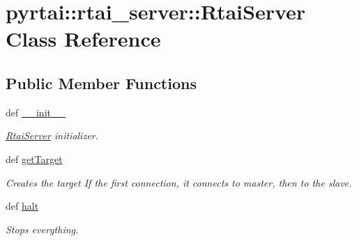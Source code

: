 \hypertarget{classpyrtai_1_1rtai__server_1_1_rtai_server}{
\section{pyrtai\-:\-:rtai\-\_\-server\-:\-:\-Rtai\-Server \-Class \-Reference}
\label{classpyrtai_1_1rtai__server_1_1_rtai_server}
}
\subsection*{\-Public \-Member \-Functions}
\begin{DoxyCompactItemize}
\item 
def \hyperlink{classpyrtai_1_1rtai__server_1_1_rtai_server_a007e1e53170de1e75e6d0561fdbeec70}{\-\_\-\-\_\-init\-\_\-\-\_\-}
\begin{DoxyCompactList}\small\item\em \hyperlink{classpyrtai_1_1rtai__server_1_1_rtai_server}{\-Rtai\-Server} initializer. \end{DoxyCompactList}\item 
def \hyperlink{classpyrtai_1_1rtai__server_1_1_rtai_server_a09adc29cacb9005385e0408ef44aa698}{get\-Target}
\begin{DoxyCompactList}\small\item\em \-Creates the target \-If the first connection, it connects to master, then to the slave. \end{DoxyCompactList}\item 
def \hyperlink{classpyrtai_1_1rtai__server_1_1_rtai_server_a55d330bcb7d996b6417018c7462d9e11}{halt}
\begin{DoxyCompactList}\small\item\em \-Stops everything. \end{DoxyCompactList}\end{DoxyCompactItemize}
